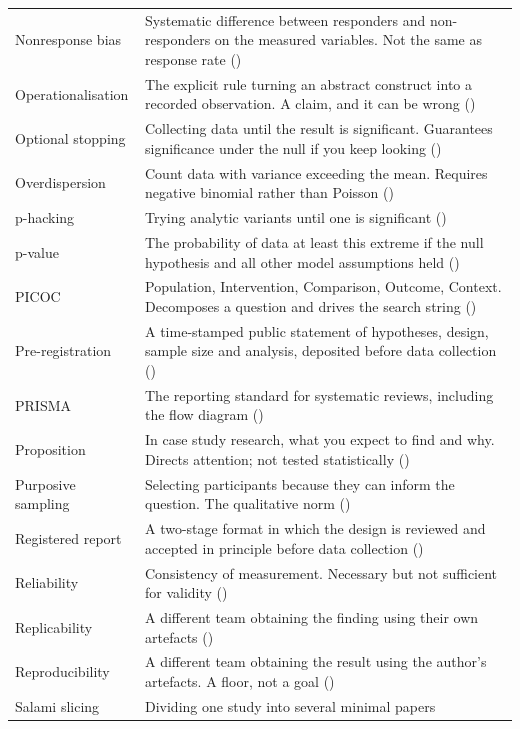 \begin{center}
\begin{longtable}{@{}L{3.6cm}L{10.5cm}@{}}
Nonresponse bias & Systematic difference between responders and non-responders
  on the measured variables. Not the same as response rate () \\
Operationalisation & The explicit rule turning an abstract construct into a
  recorded observation. A claim, and it can be wrong () \\
Optional stopping & Collecting data until the result is significant. Guarantees
  significance under the null if you keep looking () \\
Overdispersion & Count data with variance exceeding the mean. Requires negative
  binomial rather than Poisson () \\
p-hacking & Trying analytic variants until one is significant
  () \\
p-value & The probability of data at least this extreme if the null hypothesis
  and all other model assumptions held () \\
PICOC & Population, Intervention, Comparison, Outcome, Context. Decomposes a
  question and drives the search string () \\
Pre-registration & A time-stamped public statement of hypotheses, design,
  sample size and analysis, deposited before data collection
  () \\
PRISMA & The reporting standard for systematic reviews, including the flow
  diagram () \\
Proposition & In case study research, what you expect to find and why. Directs
  attention; not tested statistically () \\
Purposive sampling & Selecting participants because they can inform the
  question. The qualitative norm () \\
Registered report & A two-stage format in which the design is reviewed and
  accepted in principle before data collection () \\
Reliability & Consistency of measurement. Necessary but not sufficient for
  validity () \\
Replicability & A different team obtaining the finding using their own
  artefacts () \\
Reproducibility & A different team obtaining the result using the author's
  artefacts. A floor, not a goal () \\
Salami slicing & Dividing one study into several minimal papers

\end{longtable}
\end{center}
